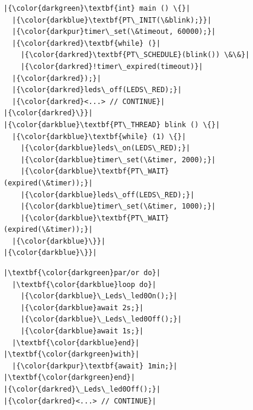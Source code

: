 \documentclass[letterpaper]{sig-alternate}
\newcommand{\CEU}{\textsc{C\'{e}u}\xspace}
\begin{document}
\begin{figure}[!t]
\begin{minipage}[t]{0.27\linewidth}
\begin{lstlisting}[title=\emph{/* nesC */}]
\end{lstlisting}
\end{minipage}
%
\hfill \vrule \hfill
\hspace{0.0cm}
%
\begin{minipage}[t]{0.30\linewidth}
\begin{lstlisting}[title=\emph{/* Protothreads */}]
|{\color{darkgreen}\textbf{int} main () \{}|
  |{\color{darkblue}\textbf{PT\_INIT(\&blink);}}|
  |{\color{darkpur}timer\_set(\&timeout, 60000);}|
  |{\color{darkred}\textbf{while} (}|
    |{\color{darkred}\textbf{PT\_SCHEDULE}(blink()) \&\&}|
    |{\color{darkred}!timer\_expired(timeout)}|
  |{\color{darkred});}|
  |{\color{darkred}leds\_off(LEDS\_RED);}|
  |{\color{darkred}<...> // CONTINUE}|
|{\color{darkred}\}}|
|{\color{darkblue}\textbf{PT\_THREAD} blink () \{}|
  |{\color{darkblue}\textbf{while} (1) \{}|
    |{\color{darkblue}leds\_on(LEDS\_RED);}|
    |{\color{darkblue}timer\_set(\&timer, 2000);}|
    |{\color{darkblue}\textbf{PT\_WAIT}(expired(\&timer));}|
    |{\color{darkblue}leds\_off(LEDS\_RED);}|
    |{\color{darkblue}timer\_set(\&timer, 1000);}|
    |{\color{darkblue}\textbf{PT\_WAIT}(expired(\&timer));}|
  |{\color{darkblue}\}}|
|{\color{darkblue}\}}|
\end{lstlisting}
\end{minipage}
%
\hfill \vrule \hfill
\hspace{0.0cm}
%
\begin{minipage}[t]{0.18\linewidth}
\begin{lstlisting}[title=/* \CEU */]
|\textbf{\color{darkgreen}par/or do}|
  |\textbf{\color{darkblue}loop do}|
    |{\color{darkblue}\_Leds\_led0On();}|
    |{\color{darkblue}await 2s;}|
    |{\color{darkblue}\_Leds\_led0Off();}|
    |{\color{darkblue}await 1s;}|
  |\textbf{\color{darkblue}end}|
|\textbf{\color{darkgreen}with}|
  |{\color{darkpur}\textbf{await} 1min;}|
|\textbf{\color{darkgreen}end}|
|{\color{darkred}\_Leds\_led0Off();}|
|{\color{darkred}<...> // CONTINUE}|
\end{lstlisting}
\end{minipage}
%
\hfill \vrule \hfill
\hspace{0.0cm}
%
\begin{minipage}[t]{0.15\linewidth}
\vspace{30pt}
\centering

\end{minipage}
\end{figure}
\end{document}
